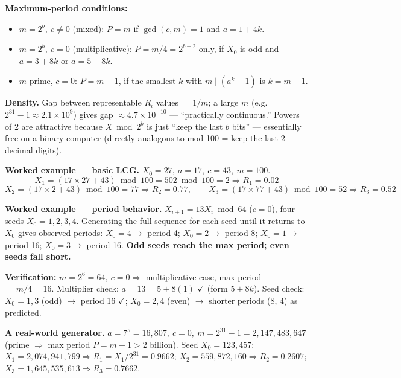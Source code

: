 \textbf{Maximum-period conditions:}
\begin{itemize}
\item $m=2^b,\ c\neq0$ (mixed): $P=m$ if $\gcd(c,m)=1$ and $a=1+4k$.
\item $m=2^b,\ c=0$ (multiplicative): $P=m/4=2^{b-2}$ only, if $X_0$ is odd and $a=3+8k$ or $a=5+8k$.
\item $m$ prime, $c=0$: $P=m-1$, if the smallest $k$ with $m\mid(a^k-1)$ is $k=m-1$.
\end{itemize}
\textbf{Density.} Gap between representable $R_i$ values $=1/m$; a large $m$ (e.g.\ $2^{31}-1\approx2.1\times10^9$) gives gap $\approx4.7\times10^{-10}$ — ``practically continuous.'' Powers of 2 are attractive because $X\bmod 2^b$ is just ``keep the last $b$ bits'' — essentially free on a binary computer (directly analogous to mod 100 = keep the last 2 decimal digits).

\begin{examplebox}
\textbf{Worked example — basic LCG.} $X_0=27,\ a=17,\ c=43,\ m=100$.
\[
X_1=(17{\times}27+43)\bmod100 = 502\bmod100=2 \Rightarrow R_1=0.02
\]
\[
X_2=(17{\times}2+43)\bmod100=77 \Rightarrow R_2=0.77, \qquad X_3=(17{\times}77+43)\bmod100=52\Rightarrow R_3=0.52
\]
\end{examplebox}

\begin{examplebox}
\textbf{Worked example — period behavior.} $X_{i+1}=13X_i\bmod64$ ($c=0$), four seeds $X_0=1,2,3,4$. Generating the full sequence for each seed until it returns to $X_0$ gives observed periods: $X_0=4\to$ period 4; $X_0=2\to$ period 8; $X_0=1\to$ period 16; $X_0=3\to$ period 16. \textbf{Odd seeds reach the max period; even seeds fall short.}

\textbf{Verification:} $m=2^6=64,\ c=0\Rightarrow$ multiplicative case, max period $=m/4=16$. Multiplier check: $a=13=5+8(1)$ $\checkmark$ (form $5+8k$). Seed check: $X_0=1,3$ (odd) $\to$ period 16 $\checkmark$; $X_0=2,4$ (even) $\to$ shorter periods (8, 4) as predicted.
\end{examplebox}

\begin{examplebox}
\textbf{A real-world generator.} $a=7^5=16{,}807,\ c=0,\ m=2^{31}-1=2{,}147{,}483{,}647$ (prime $\Rightarrow$ max period $P=m-1>2$ billion). Seed $X_0=123{,}457$: $X_1=2{,}074{,}941{,}799\Rightarrow R_1=X_1/2^{31}=0.9662$; $X_2=559{,}872{,}160\Rightarrow R_2=0.2607$; $X_3=1{,}645{,}535{,}613\Rightarrow R_3=0.7662$.
\end{examplebox}

